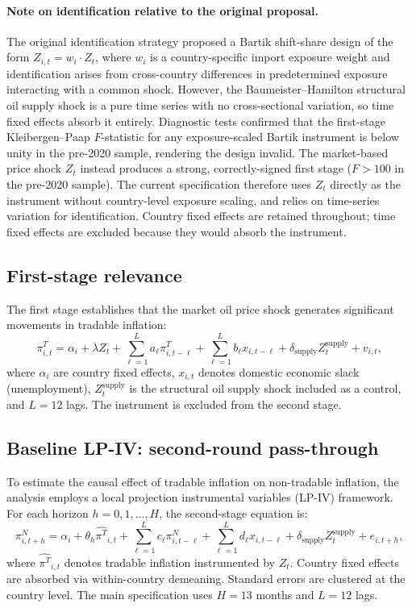 \documentclass[11pt]{article}
\begin{document}
\paragraph{Note on identification relative to the original proposal.} The original identification strategy proposed a Bartik shift-share design of the form $Z_{i,t} = w_i \cdot Z_t$, where $w_i$ is a country-specific import exposure weight and identification arises from cross-country differences in predetermined exposure interacting with a common shock. However, the Baumeister--Hamilton structural oil supply shock is a pure time series with no cross-sectional variation, so time fixed effects absorb it entirely. Diagnostic tests confirmed that the first-stage Kleibergen--Paap $F$-statistic for any exposure-scaled Bartik instrument is below unity in the pre-2020 sample, rendering the design invalid. The market-based price shock $Z_t$ instead produces a strong, correctly-signed first stage ($F > 100$ in the pre-2020 sample). The current specification therefore uses $Z_t$ directly as the instrument without country-level exposure scaling, and relies on time-series variation for identification. Country fixed effects are retained throughout; time fixed effects are excluded because they would absorb the instrument.

\subsection{First-stage relevance}

The first stage establishes that the market oil price shock generates significant movements in tradable inflation:
\begin{equation}
\pi^T_{i,t}
=
\alpha_i
+ \lambda Z_t
+ \sum_{\ell=1}^{L} a_\ell \pi^T_{i,t-\ell}
+ \sum_{\ell=1}^{L} b_\ell x_{i,t-\ell}
+ \delta_{\text{supply}} Z^{\text{supply}}_t
+ v_{i,t},
\label{eq:firststage}
\end{equation}
where $\alpha_i$ are country fixed effects, $x_{i,t}$ denotes domestic economic slack (unemployment), $Z^{\text{supply}}_t$ is the structural oil supply shock included as a control, and $L = 12$ lags. The instrument is excluded from the second stage.

\subsection{Baseline LP-IV: second-round pass-through}

To estimate the causal effect of tradable inflation on non-tradable inflation, the analysis employs a local projection instrumental variables (LP-IV) framework. For each horizon $h = 0, 1, \dots, H$, the second-stage equation is:
\begin{equation}
\pi^N_{i,t+h}
=
\alpha_i
+ \theta_h \widehat{\pi^T}_{i,t}
+ \sum_{\ell=1}^{L} c_\ell \pi^N_{i,t-\ell}
+ \sum_{\ell=1}^{L} d_\ell x_{i,t-\ell}
+ \delta_{\text{supply}} Z^{\text{supply}}_t
+ e_{i,t+h},
\label{eq:lpiv}
\end{equation}
where $\widehat{\pi^T}_{i,t}$ denotes tradable inflation instrumented by $Z_t$. Country fixed effects are absorbed via within-country demeaning. Standard errors are clustered at the country level. The main specification uses $H = 13$ months and $L = 12$ lags.
\end{document}
